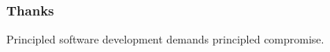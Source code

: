 \begin{frame}
\frametitle{Thanks}
\begin{center}
Principled software development demands principled compromise.
\end{center}
\end{frame}
